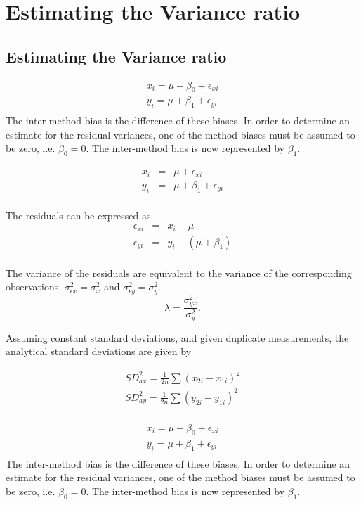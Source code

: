 \documentclass[12pt, a4paper]{report}
\theoremstyle{plain}
\theoremstyle{definition}
\theoremstyle{remark}
\begin{document}
\section{Estimating the Variance ratio}
\subsection{Estimating the Variance ratio}
\begin{eqnarray*}
	x_{i} = \mu +  \beta_{0} + \epsilon_{xi}\\
	y_{i} = \mu +  \beta_{1} + \epsilon_{yi}\\
\end{eqnarray*}
The inter-method bias is the difference of these biases. In order to determine an estimate for the residual variances, one of the method biases must be assumed to be zero, i.e. $\beta_{0} = 0$. The inter-method bias is now represented by $\beta_{1}$.

\begin{eqnarray*}
	x_{i} &=& \mu + \epsilon_{xi}\\
	y_{i} &=& \mu +  \beta_{1} + \epsilon_{yi}\\
\end{eqnarray*}

The residuals can be expressed as
\begin{eqnarray*}
	\epsilon_{xi} &=& x_{i} - \mu  \\
	\epsilon_{yi} &=& y_{i} - (\mu + \beta_{1}) \\
\end{eqnarray*}

The variance of the residuals are equivalent to the variance of the corresponding observations, $\sigma^{2}_{\epsilon x} =
\sigma^{2}_{x}$ and $\sigma^{2}_{\epsilon y} = \sigma^{2}_{y}$.
\begin{equation}
\lambda = \frac{\sigma^{2}_{yx}}{\sigma^{2}_{y}}.
\end{equation}

Assuming constant standard deviations, and given duplicate measurements, the analytical standard deviations are given by

\begin{eqnarray*}
	SD^{2}_{ax} = \frac{1}{2n} \sum (x_{2i} - x_{1i})^{2}\\
	SD^{2}_{ay} = \frac{1}{2n} \sum (y_{2i} - y_{1i})^{2}\\
\end{eqnarray*}

\begin{eqnarray*}
	x_{i} = \mu +  \beta_{0} + \epsilon_{xi}\\
	y_{i} = \mu +  \beta_{1} + \epsilon_{yi}\\
\end{eqnarray*}
The inter-method bias is the difference of these biases. In order to determine an estimate for the residual variances, one of the method biases must be assumed to be zero, i.e. $\beta_{0} = 0$. The inter-method bias is now represented by $\beta_{1}$.
\end{document}
